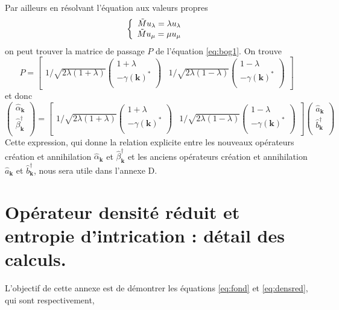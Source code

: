 \documentclass[a4paper, french]{report}
\newcommand{\an}{\hat{a}}
\newcommand{\blbl}{création et annihilation }
\newcommand{\bcre}{\hat{b}^\dagger}
\newcommand{\ond}{\ensuremath{\mathbf{k}\xspace}}
\newcommand{\gam}{\gamma(\ond{})}
\newcommand{\alan}{\hat{\alpha}_{\ond}}
\newcommand{\betcre}{\hat{\beta}^\dagger_{\ond}}
\newcommand{\1}{\ensuremath{\ket{\om_1\bom_1}}\xspace}
\newcommand{\2}{\ensuremath{\ket{\om_2\bom_2}}\xspace}
\newcommand{\tilm}{\ensuremath{\tilde{M}}\xspace}
\begin{document}
Par ailleurs en résolvant l'équation aux valeurs propres
\begin{equation}
\left\{
	\begin{array}{r c l}
		\tilm u_\lambda= \lambda u_\lambda\\
		\tilm u_\mu = \mu u_\mu
	\end{array}
\right.
\end{equation}
on peut trouver la matrice de passage $P$ de l'équation \ref{eq:bog1}. On trouve
\[
	P=\begin{bmatrix}
	1/\sqrt{2\lambda(1+\lambda)}
	\begin{pmatrix}
	1+\lambda\\
	-\gam^*\\
	\end{pmatrix}
	&
	1/\sqrt{2\lambda(1-\lambda)}
	\begin{pmatrix}
	1-\lambda\\
	-\gam^*\\
	\end{pmatrix}
	\end{bmatrix}
\]
et donc
\begin{equation}
\label{eq:transfobog}
	\begin{pmatrix}
	\alan\\
	\betcre\\
	\end{pmatrix}
	=
	\begin{bmatrix}
	1/\sqrt{2\lambda(1+\lambda)}
	\begin{pmatrix}
	1+\lambda\\
	-\gam^*\\
	\end{pmatrix}
	&
	1/\sqrt{2\lambda(1-\lambda)}
	\begin{pmatrix}
	1-\lambda\\
	-\gam^*\\
	\end{pmatrix}
	\end{bmatrix}
	\begin{pmatrix}
	\an_\ond \\
	\bcre_\ond \\
	\end{pmatrix}
\end{equation}
Cette expression, qui donne la relation explicite entre les nouveaux opérateurs \blbl $\alan$ et  $\betcre$ et les anciens opérateurs \blbl $\an_\ond$ et $\bcre_\ond$, nous sera utile dans l'annexe D.

\chapter{Opérateur densité réduit et entropie d'intrication : détail des calculs.}
L'objectif de cette annexe est de démontrer les équations \ref{eq:fond} et \ref{eq:densred}, qui sont respectivement,
\end{document}
